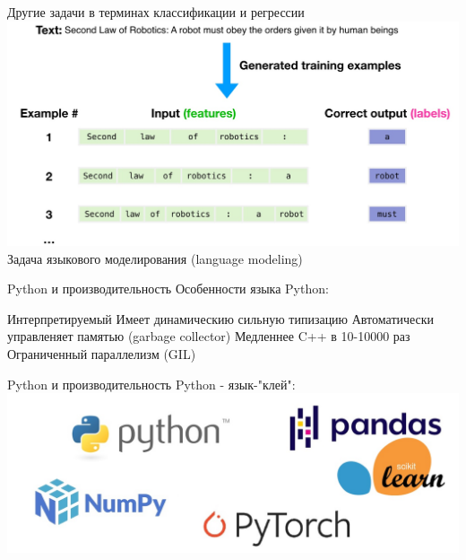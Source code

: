 \documentclass[aspectratio=169, professionalfonts]{beamer}
\begin{document}
\begin{frame}{Другие задачи в терминах классификации и регрессии}
    \centering
    \includegraphics[width=.75\linewidth]{figures/fig8-lm.jpg} \\
    Задача языкового моделирования (language modeling)
\end{frame}

\begin{frame}{Python и производительность}
    Особенности языка Python:
    \begin{outline}
        \1 Интерпретируемый
        \1 Имеет динамическию сильную типизацию
        \1 Автоматически управленяет памятью (garbage collector)
        \1 Медленнее C++ в 10-10000 раз
        \1 Ограниченный параллелизм (GIL)
    \end{outline}
\end{frame}

\begin{frame}{Python и производительность}
    Python - язык-"клей": \\
    \includegraphics[width=.9\linewidth]{figures/fig9-libraries.jpg}
\end{frame}
\end{document}
